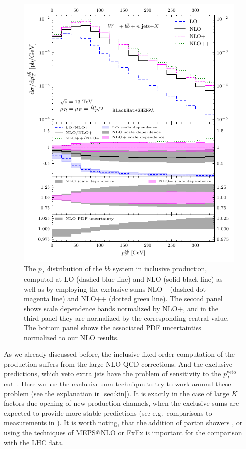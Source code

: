 \begin{figure}[ht]
  \centering
  \includegraphics[clip,scale=1]{plots/excl_ptbb_v4}
  \caption{The $p_T$ distribution of the $b\bar{b}$ system in inclusive \Wbbm{} production,
    computed at LO (dashed blue line) and NLO (solid black line) as well as
    by employing the exclusive sums NLO+ (dashed-dot magenta line)
    and NLO++ (dotted green line).
    The second panel shows scale dependence bands normalized by NLO+,
    and in the third panel they are normalized by the corresponding
    central value. The bottom panel shows the associated PDF uncertainties
    normalized to our NLO results.}
  \label{fig_Wmnjptbb}
\end{figure}

As we already discussed before, the inclusive fixed-order computation
of the \Wbb{} production suffers from the large NLO QCD corrections.
And the exclusive predictions, which veto extra jets have the problem of sensitivity
to the $p_T^\mathrm{veto}$ cut~\cite{Tackmann:2012bt}. 
Here we use the exclusive-sum technique \cite{ESums}
to try to work around these problem (see the explanation in \cref{sec:kin}).
It is exactly in the case of large $K$ factors due opening of new production channels, when
the exclusive sums are expected to provide more stable predictions (see e.g.\ comparisons to measurements in \cite{Aad:2014qxa,ATLAS:ratio2017}). 
It is worth noting, that the addition of parton showers \cite{Luisoni:2015mpa},
or using the techniques of MEPS@NLO \cite{Hoeche:2012yf} or FxFx \cite{Frederix:2012ps}
is important for the comparison with the LHC data.


